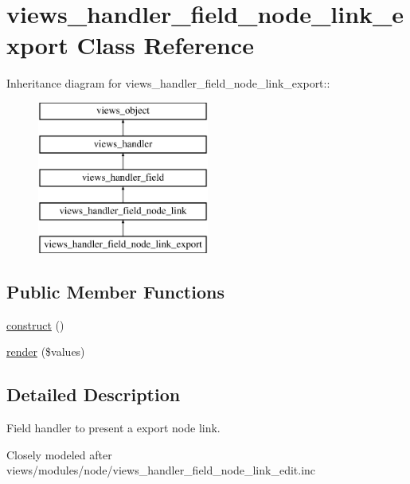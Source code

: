 \hypertarget{classviews__handler__field__node__link__export}{
\section{views\_\-handler\_\-field\_\-node\_\-link\_\-export Class Reference}
\label{classviews__handler__field__node__link__export}
}
Inheritance diagram for views\_\-handler\_\-field\_\-node\_\-link\_\-export::\begin{figure}[H]
\begin{center}
\leavevmode
\includegraphics[height=5cm]{classviews__handler__field__node__link__export}
\end{center}
\end{figure}
\subsection*{Public Member Functions}
\begin{CompactItemize}
\item 
\hyperlink{classviews__handler__field__node__link__export_1ccad9b1e274a9345a3f167a58e7f997}{construct} ()
\item 
\hyperlink{classviews__handler__field__node__link__export_84502b9c08a9b0fa22eb914b278d1a4f}{render} (\$values)
\end{CompactItemize}


\subsection{Detailed Description}
Field handler to present a export node link.

Closely modeled after views/modules/node/views\_\-handler\_\-field\_\-node\_\-link\_\-edit.inc 

